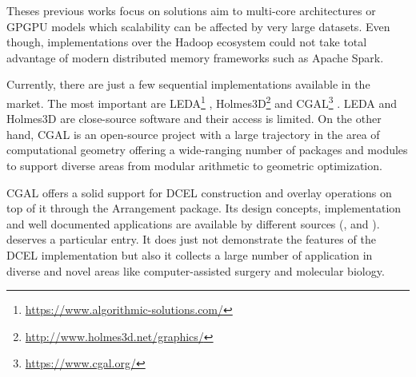 Theses previous works focus on solutions aim to multi-core architectures or GPGPU models which scalability can be affected by very large datasets.  Even though, implementations over the Hadoop ecosystem could not take total advantage of modern distributed memory frameworks such as Apache Spark.

Currently, there are just a few sequential implementations available in the market.  The most important are LEDA\footnote{\url{https://www.algorithmic-solutions.com/}} \cite{mehlhorn_leda_1995}, Holmes3D\footnote{\url{http://www.holmes3d.net/graphics/}} \cite{holmes_dcel_2021} and CGAL\footnote{\url{https://www.cgal.org/}} \cite{fogel_cgal_2012}.  LEDA and Holmes3D are close-source software and their access is limited.  On the other hand, CGAL is an open-source project with a large trajectory in the area of computational geometry offering a wide-ranging number of packages and modules to support diverse areas from modular arithmetic to geometric optimization.

CGAL offers a solid support for DCEL construction and overlay operations on top of it through the Arrangement package.  Its design concepts, implementation and well documented applications are available by different sources (\cite{flato_design_2001}, \cite{haran_experimental_2009} and \cite{wein_advanced_2007}).  \cite{fogel_cgal_2012} deserves a particular entry.  It does just not demonstrate the features of the DCEL implementation but also it collects a large number of application in diverse and novel areas like computer-assisted surgery and molecular biology.
